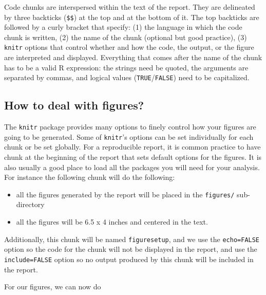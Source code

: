 \documentclass[
]{book}
\providecommand{\tightlist}{%
  \setlength{\itemsep}{0pt}\setlength{\parskip}{0pt}}
\begin{document}
Code chunks are interspersed within the text of the report. They are delineated by three backticks (\texttt{\$\textasciigrave{}\textasciigrave{}\textasciigrave{}\$}) at the top and at the bottom of it. The top backticks are followed by a curly bracket that specify: (1) the language in which the code chunk is written, (2) the name of the chunk (optional but good practice), (3) \texttt{knitr} options that control whether and how the code, the output, or the figure are interpreted and displayed. Everything that comes after the name of the chunk has to be a valid R expression: the strings need be quoted, the arguments are separated by commas, and logical values (\texttt{TRUE}/\texttt{FALSE}) need to be capitalized.

\hypertarget{how-to-deal-with-figures}{%
\subsection{How to deal with figures?}\label{how-to-deal-with-figures}}

The \texttt{knitr} package provides many options to finely control how your figures are going to be generated. Some of \texttt{knitr}'s options can be set individually for each chunk or be set globally. For a reproducible report, it is common practice to have chunk at the beginning of the report that sets default options for the figures. It is also usually a good place to load all the packages you will need for your analysis. For instance the following chunk will do the following:

\begin{itemize}
\tightlist
\item
  all the figures generated by the report will be placed in the \texttt{figures/} sub-directory
\item
  all the figures will be 6.5 x 4 inches and centered in the text.
\end{itemize}

Additionally, this chunk will be named \texttt{figuresetup}, and we use the \texttt{echo=FALSE} option so the code for the chunk will not be displayed in the report, and use the \texttt{include=FALSE} option so no output produced by this chunk will be included in the report.

For our figures, we can now do
\end{document}

